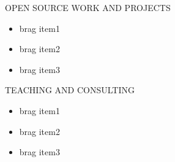 \documentclass{./src/smartcv} %
\begin{document}
\begin{rSection}{OPEN SOURCE WORK AND PROJECTS}
  \begin{itemize}
    \item brag item1
    \item brag item2
    \item brag item3
  \end{itemize}

\end{rSection}

\begin{rSection}{TEACHING AND CONSULTING}
  \begin{itemize}
    \item brag item1
    \item brag item2
    \item brag item3
  \end{itemize}

\end{rSection}
\end{document}
